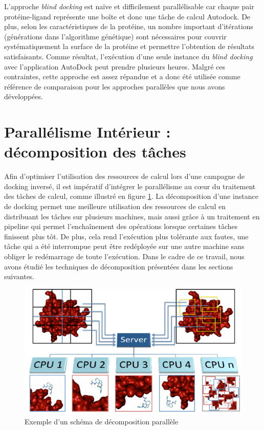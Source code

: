 L'approche \textit{blind docking} est naïve et difficilement parallélisable car chaque pair protéine-ligand représente une boîte et donc une tâche de calcul Autodock. De plus, selon les caractéristiques de la protéine, un nombre important d'itérations (générations dans l'algorithme génétique) sont nécessaires pour couvrir systématiquement la surface de la protéine et permettre l'obtention de résultats satisfaisants. Comme résultat, l'exécution d'une seule instance du \textit{blind docking} avec l'application AutoDock peut prendre plusieurs heures. Malgré ces contraintes, cette approche est assez répandue et a donc été utilisée comme référence de comparaison pour les approches parallèles que nous avons développées.

\section{Parallélisme Intérieur : décomposition des tâches}
Afin d'optimiser l'utilisation des ressources de calcul lors d'une campagne de docking inversé, il est impératif d'intégrer le parallélisme au c{\oe}ur du traitement des tâches de calcul, comme illustré en figure \ref{fig:romain-fig1}. La décomposition d'une instance de docking permet une meilleure utilisation des ressources de calcul en distribuant les tâches sur plusieurs machines, mais aussi grâce à un traitement en pipeline qui permet l'enchaînement des opérations lorsque certaines tâches finissent plus tôt. De plus, cela rend l'exécution plus tolérante aux fautes, une tâche qui a été interrompue peut être redéployée sur une autre machine sans obliger le redémarrage de toute l'exécution. Dans le cadre de ce travail, nous avons étudié les techniques de décomposition présentées dans les sections suivantes. 

\begin{figure}
	\centering
		\includegraphics[width=0.65\linewidth]{images/Romain/fig1-color}
	\caption{Exemple d'un schéma de décomposition parallèle}\label{fig:romain-fig1}
\end{figure}

